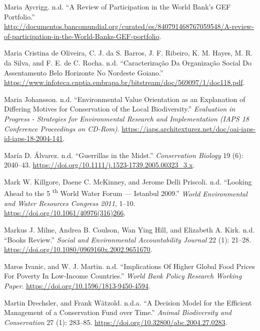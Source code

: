 \begin{CSLReferences}{1}{0}
Maria Aycrigg. n.d. {``A Review of Participation in the World Bank's GEF
Portfolio.''}
\url{http://documentos.bancomundial.org/curated/es/840791468767059548/A-review-of-participation-in-the-World-Banks-GEF-portfolio}.

Maria Cristina de Oliveira, C. J. da S. Barros, J. F. Ribeiro, K. M.
Hayes, M. R. da Silva, and F. E. de C. Rocha. n.d. {``Caracterização Da
Organização Social Do Assentamento Belo Horizonte No Nordeste Goiano.''}
\url{https://www.infoteca.cnptia.embrapa.br/bitstream/doc/569097/1/doc118.pdf}.

Maria Johansson. n.d. {``Environmental Value Orientation as an
Explanation of Differing Motives for Conservation of the Local
Biodiversity.''} \emph{Evaluation in Progress - Strategies for
Environmental Research and Implementation (IAPS 18 Conference
Proceedings on CD-Rom)}.
\url{https://iaps.architexturez.net/doc/oai-iaps-id-iaps-18-2004-141}.

María D. Álvarez. n.d. {``Guerrillas in the Midst.''} \emph{Conservation
Biology} 19 (6): 2040--43.
\url{https://doi.org/10.1111/j.1523-1739.2005.00323_3.x}.

Mark W. Killgore, Daene C. McKinney, and Jerome Delli Priscoli. n.d.
{``Looking Ahead to the 5 \textsuperscript{th} World Water Forum ---
Istanbul 2009.''} \emph{World Environmental and Water Resources Congress
2011}, 1--10. \url{https://doi.org/10.1061/40976(316)266}.

Markus J. Milne, Andrea B. Coulson, Wan Ying Hill, and Elizabeth A.
Kirk. n.d. {``Books Review.''} \emph{Social and Environmental
Accountability Journal} 22 (1): 21--28.
\url{https://doi.org/10.1080/0969160x.2002.9651670}.

Maros Ivanic, and W. J. Martin. n.d. {``Implications Of Higher Global
Food Prices For Poverty In Low-Income Countries.''} \emph{World Bank
Policy Research Working Paper}.
\url{https://doi.org/10.1596/1813-9450-4594}.

Martin Drechsler, and Frank Wätzold. n.d.a. {``A Decision Model for the
Efficient Management of a Conservation Fund over Time.''} \emph{Animal
Biodiversity and Conservation} 27 (1): 283--85.
\url{https://doi.org/10.32800/abc.2004.27.0283}.


\end{CSLReferences}
